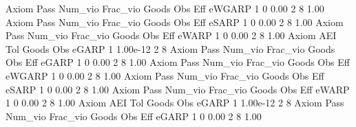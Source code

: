 {\smallskip}
       Axiom {\VBAR} Pass     Num_vio    Frac_vio       Goods         Obs         Eff  
      eWGARP {\VBAR}    1           0        0.00           2           8        1.00  
{\smallskip}
{\smallskip}
{\smallskip}
       Axiom {\VBAR} Pass     Num_vio    Frac_vio       Goods         Obs         Eff  
       eSARP {\VBAR}    1           0        0.00           2           8        1.00  
{\smallskip}
{\smallskip}
{\smallskip}
       Axiom {\VBAR} Pass     Num_vio    Frac_vio       Goods         Obs         Eff  
       eWARP {\VBAR}    1           0        0.00           2           8        1.00  
{\smallskip}
       Axiom {\VBAR}       AEI        Tol      Goods        Obs 
       eGARP {\VBAR}         1   1.00e-12          2          8 
{\smallskip}
{\smallskip}
{\smallskip}
       Axiom {\VBAR} Pass     Num_vio    Frac_vio       Goods         Obs         Eff  
       eGARP {\VBAR}    1           0        0.00           2           8        1.00  
{\smallskip}
{\smallskip}
{\smallskip}
       Axiom {\VBAR} Pass     Num_vio    Frac_vio       Goods         Obs         Eff  
      eWGARP {\VBAR}    1           0        0.00           2           8        1.00  
{\smallskip}
{\smallskip}
{\smallskip}
       Axiom {\VBAR} Pass     Num_vio    Frac_vio       Goods         Obs         Eff  
       eSARP {\VBAR}    1           0        0.00           2           8        1.00  
{\smallskip}
{\smallskip}
{\smallskip}
       Axiom {\VBAR} Pass     Num_vio    Frac_vio       Goods         Obs         Eff  
       eWARP {\VBAR}    1           0        0.00           2           8        1.00  
{\smallskip}
       Axiom {\VBAR}       AEI        Tol      Goods        Obs 
       eGARP {\VBAR}         1   1.00e-12          2          8 
{\smallskip}
{\smallskip}
{\smallskip}
       Axiom {\VBAR} Pass     Num_vio    Frac_vio       Goods         Obs         Eff  
       eGARP {\VBAR}    1           0        0.00           2           8        1.00  
